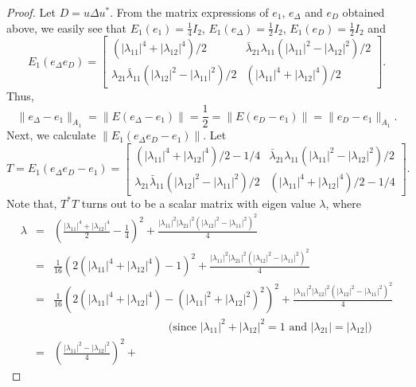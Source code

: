 \documentclass[10pt,a4paper]{amsart}
\begin{document}
\begin{proof} Let $D = u \Delta u^*$. From the matrix expressions of  $e_1$, $e_\Delta$ and $e_D$ obtained above, we easily see that
$E_1(e_1) = \frac{1}{4} I_2$, $E_1(e_\Delta)= \frac{1}{2}I_2$, $E_1(e_D) = 
  \frac{1}{2} I_2$ and
  \[
  E_1(e_\Delta e_D) = \begin{bmatrix}
   {(|\lambda_{11}|^4 + |\lambda_{12}|^4)}/{2} & \bar{\lambda}_{21}
    \lambda_{11}(|\lambda_{11}|^2 - |\lambda_{12}|^2)/2
    \\ \lambda_{21} \bar{\lambda}_{11}(|\lambda_{12}|^2 -
    |\lambda_{11}|^2)/2 & (|\lambda_{11}|^4 + |\lambda_{12}|^4)/2
  \end{bmatrix}.
  \]
  Thus,
  \[
\|e_\Delta -e_1 \|_{A_1} = \| E(e_\Delta - e_1)\|= \frac{1}{2} = \| E(e_D - e_1)\| = \|e_{D} -e_1 \|_{A_1}. 
  \]
  Next, we calculate $\|E_1(e_\Delta e_D - e_1) \|$.   Let
  \[
  T= E_1(e_\Delta e_D - e_1) = \begin{bmatrix} (|\lambda_{11}|^4 +
    |\lambda_{12}|^4)/2 - 1/4 & \bar{\lambda}_{21}
    \lambda_{11}(|\lambda_{11}|^2 - |\lambda_{12}|^2)/2
    \\ \lambda_{21} \bar{\lambda}_{11}(|\lambda_{12}|^2 - |\lambda_{11}|^2)/2 &
    (|\lambda_{11}|^4 + |\lambda_{12}|^4)/2 - 1/4
  \end{bmatrix}.
  \]
  Note that, $T^*T$ turns out to be a scalar  matrix with eigen value
  $\lambda$, where
	\begin{eqnarray*}
		\lambda & = & \left(\frac{|\lambda_{11}|^4 +
                  |\lambda_{12}|^4}{2} - \frac{1}{4}\right)^2 +
                \frac{|\lambda_{11}|^2 |\lambda_{21}|^2
                  (|\lambda_{12}|^2 - |\lambda_{11}|^2)^2}{4} \\ & = & \frac{1}{16} \left( 2(|\lambda_{11}|^4 + |\lambda_{12}|^4) - 1\right) ^2 + \frac{|\lambda_{11}|^2 |\lambda_{21}|^2
                  (|\lambda_{12}|^2 - |\lambda_{11}|^2)^2}{4} \\ & = & \frac{1}{16} \left( 2(|\lambda_{11}|^4 + |\lambda_{12}|^4) - (|\lambda_{11}|^2 + |\lambda_{12}|^2)^2\right) ^2 + \frac{|\lambda_{11}|^2 |\lambda_{12}|^2
                  (|\lambda_{12}|^2 - |\lambda_{11}|^2)^2}{4} \\
                  & & \qquad \qquad
                \qquad \qquad \qquad \text{ (since
                  $|\lambda_{11}|^2+|\lambda_{12}|^2 = 1$ and
                  $|\lambda_{21}| = |\lambda_{12}|$)}\\
                   & = &
                \left(\frac{|\lambda_{11}|^2 -
                  |\lambda_{12}|^2}{4}\right)^2 +

\end{eqnarray*}
\end{proof}
\end{document}
